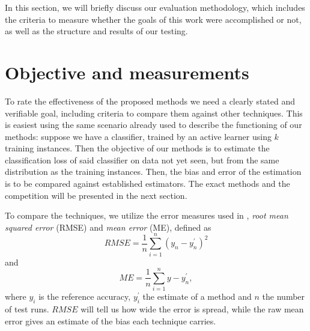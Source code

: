 \label{evaluation}

In this section, we will briefly discuss our evaluation methodology, which includes the criteria to measure whether the goals of this work were accomplished or not, as well as the structure and results of our testing.

\section{Objective and measurements}

To rate the effectiveness of the proposed methods we need a clearly stated and verifiable goal, including criteria to compare them against other techniques. This is easiest using the same scenario already used to describe the functioning of our methods: suppose we have a classifier, trained by an active learner using $k$ training instances. Then the objective of our methods is to estimate the classification loss of said classifier on data not yet seen, but from the same distribution as the training instances. Then, the bias and error of the estimation is to be compared against established estimators. The exact methods and the competition will be presented in the next section.

To compare the techniques, we utilize the error measures used in \cite{FigueroaEtal2012}, \textit{root mean squared error} (RMSE) and \textit{mean error} (ME), defined as
\begin{equation}
RMSE = \frac{1}{n} \sum_{i=1}^{n} \left(y_n - y_n^{'}\right)^2
\end{equation}
and
\begin{equation}
ME = \frac{1}{n} \sum_{i=1}^{n} y - y_n^{'},
\end{equation}
where $y_i$ is the reference accuracy, $y_i^{'}$ the estimate of a method and $n$ the number of test runs. $RMSE$ will tell us how wide the error is spread, while the raw mean error gives an estimate of the bias each technique carries.

